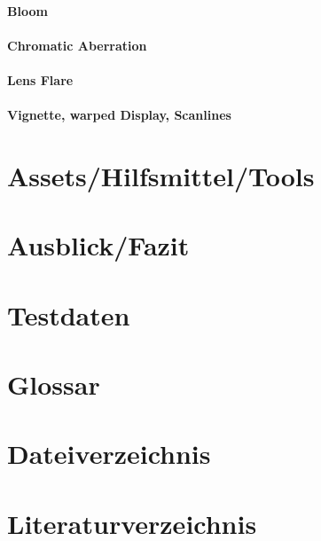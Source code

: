 \documentclass[a4paper,10pt,ngerman,fontsize=12pt]{scrreprt}
\begin{document}
\subsubsection{Bloom}
\lipsum[3]


\subsubsection{Chromatic Aberration}
\lipsum[3]


\subsubsection{Lens Flare}
\lipsum[3]


\subsubsection{Vignette, warped Display, Scanlines}
\lipsum[3]



\chapter{Assets/Hilfsmittel/Tools}
\lipsum[3]




\chapter{Ausblick/Fazit}
\lipsum[3]




\chapter{Testdaten}
\lipsum[3]





\chapter{Glossar}
\lipsum[3]




\chapter{Dateiverzeichnis}
\lipsum[3]




\chapter{Literaturverzeichnis}
\lipsum[3]
\end{document}
